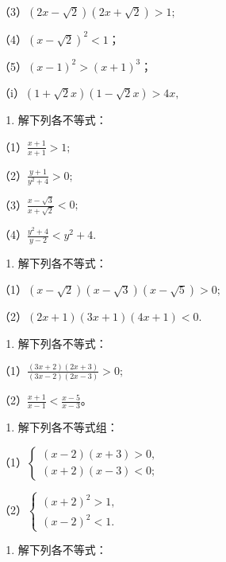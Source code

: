（3）\((2x - \sqrt{2})(2x + \sqrt{2}) > 1;\)

（4）\((x - \sqrt{2})^2 < 1\)；

（5）\((x - 1)^{2} > (x + 1)^{3}\)；

（i）\((1 + \sqrt{2} x)(1 - \sqrt{2} x) > 4x,\)

\begin{enumerate}[start=10]
\item
  解下列各不等式：
\end{enumerate}

（1）\(\frac{x + 1}{x + 1} > 1;\)

（2）\(\frac{y + 1}{y^2 + 4} > 0;\)

（3）\(\frac{x - \sqrt{3}}{x + \sqrt{2}} < 0;\)

（4）\(\frac{y^2 + 4}{y - 2} < y^2 + 4.\)

\begin{enumerate}[start=11]
\item
  解下列各不等式：
\end{enumerate}

（1）\((x - \sqrt{2})(x - \sqrt{3})(x - \sqrt{5}) > 0;\)

（2）\((2x + 1)(3x + 1)(4x + 1) < 0.\)

\begin{enumerate}[start=12]
\item
  解下列各不等式：
\end{enumerate}

（1）\(\frac{(3x + 2)(2x + 3)}{(3x - 2)(2x - 3)} > 0;\)

（2）\(\frac{x + 1}{x - 1} < \frac{x - 5}{x - 3}\)。

\begin{enumerate}[start=13]
\item
  解下列各不等式组：
\end{enumerate}

（1）\(\left\{ \begin{array}{l} (x - 2)(x + 3) > 0, \\ (x + 2)(x - 3) < 0; \end{array} \right.\)

（2）\(\left\{ \begin{array}{l} (x + 2)^2 > 1, \\ (x - 2)^2 < 1. \end{array} \right.\)

\begin{enumerate}[start=14]
\item
  解下列各不等式：
\end{enumerate}

